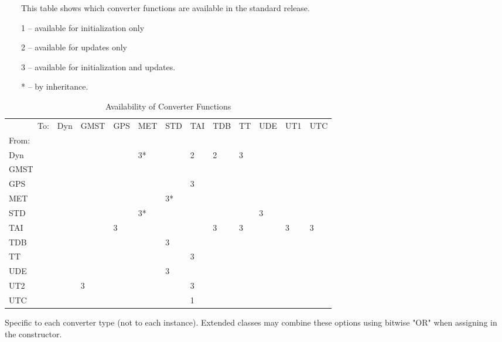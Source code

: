 {\begin{enumerate}
\begin{table}[h]
   \caption{Availability of Converter Functions} 
\vspace{0.25in}
\ \ \ \ This table shows which converter functions are available in the 
standard release.
   
\ \ \ \ 1 -- available for initialization only

\ \ \ \ 2 -- available for updates only
         
\ \ \ \ 3 -- available for initialization and updates.
         
\ \ \ \ * -- by inheritance.
\vspace{0.25in}
         
         
   \centering
   \label{tab:ConverterFunctions} 
      \begin{tabular}{||l|l|l|l|l|l|l|l|l|l|l|l||} \hline
   \ \ \ \ \ \ \ To: &Dyn &GMST &GPS &MET &STD &TAI &TDB &TT &UDE &UT1 &UTC\\
From: &~ &~ &~ &~ &~ &~ &~ &~ &~ &~ &~\\ \hline
Dyn &~ &~ &~ & 3* &~ & 2 & 2 & 3 &~ &~\\\hline
GMST &~ &~ &~ &~ &~ &~ &~ &~ &~ &~ &~\\\hline
GPS &~ &~ &~ &~ &~ & 3 &~ &~ &~ &~ &~\\\hline
MET &~ &~ &~ &~ & 3* &~ &~ &~ &~ &~ &~\\\hline
STD &~ &~ &~ & 3* &~ &~ &~ &~ & 3 &~ &~\\\hline
TAI &~ &~ & 3 &~ &~ &~ & 3 & 3 &~ & 3 & 3 \\\hline
TDB &~ &~ &~ &~ & 3 &~ &~ &~ &~ &~\\\hline
TT &~ &~ &~ &~ &~ & 3 &~ &~ &~ &~ &~\\\hline
UDE &~ &~ &~ &~ & 3 &~ &~ &~ &~ &~ &~\\\hline
UT2 &~ & 3 &~ &~ &~ & 3 &~ &~ &~ &~ &~\\\hline
UTC &~ &~ &~ &~ &~ & 1 &~ &~ &~ &~ &~\\\hline

   \end{tabular}
   
   
   
   
\end{table}

{\begin{enumerate}

Specific to each converter type (not to each instance). Extended classes may  
combine these options using bitwise "OR" when assigning in the constructor.


\end{enumerate}}
\end{enumerate}}
